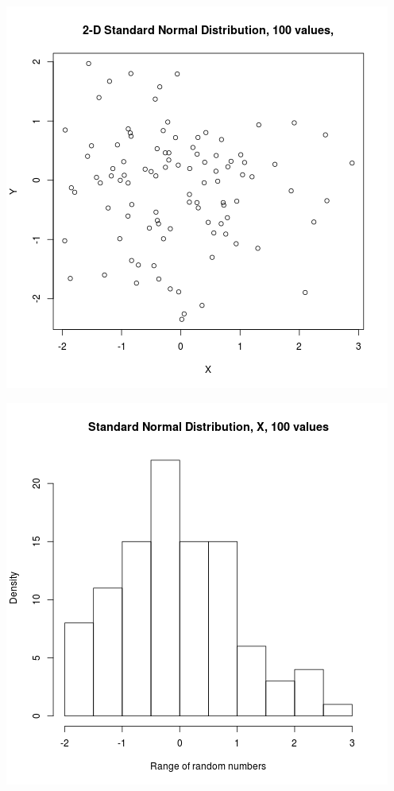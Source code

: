 \documentclass{article}
\begin{document}
\includegraphics{"plot1_1"}
\pagebreak


\includegraphics{"plot1_1_X"}
\pagebreak
\end{document}
